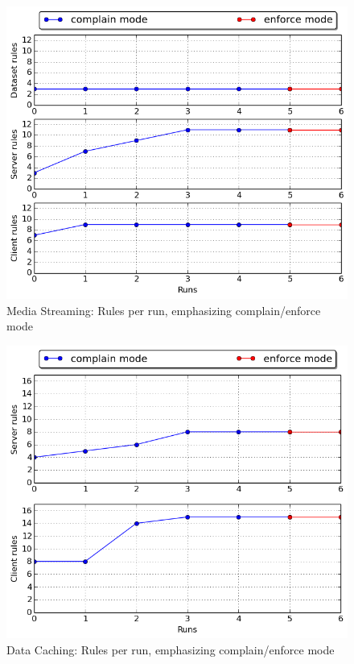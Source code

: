 \hfill\break

\begin{figure}[h!]
  \centering
   \includegraphics[width=0.8\linewidth]{../figures/mediastreaming/complain_enforce_rules.png}
   \caption{Media Streaming: Rules per run, emphasizing complain/enforce mode}
\end{figure}

\hfill\break

\begin{figure}[h!]
  \centering
   \includegraphics[width=0.75\linewidth]{../figures/datacaching/complain_enforce_rules.png}
   \caption{Data Caching: Rules per run, emphasizing complain/enforce mode}
\end{figure}

